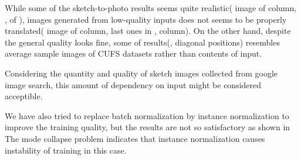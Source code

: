 While some of the sketch-to-photo results seems quite realistic( image of  column, ,  of ), images generated from low-quality inputs does not seems to be properly translated( image of  column, last ones in ,  column). 
On the other hand, despite the general quality looks fine, some of results(,  diagonal positions) resembles average sample images of CUFS datasets rather than contents of input.

Considering the quantity and quality of sketch images collected from google image search, this amount of dependency on input might be considered acceptible.

We have also tried to replace batch normalization by instance normalization to improve the training quality, but the results are not so satisfactory as shown in %
The mode collapse problem indicates that instance normalization causes instability of training in this case.




\endinput

